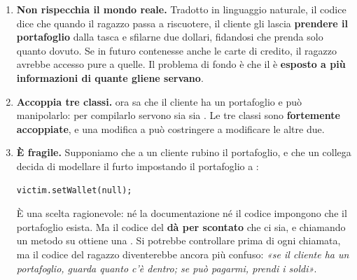 \begin{enumerate}
  \item \textbf{Non rispecchia il mondo reale.} Tradotto in linguaggio naturale, il codice dice che quando il ragazzo
        passa a riscuotere, il cliente gli lascia \textbf{prendere il portafoglio} dalla tasca e sfilarne due dollari,
        fidandosi che prenda solo quanto dovuto. Se in futuro  contenesse anche le carte di credito, il
        ragazzo avrebbe accesso pure a quelle. Il problema di fondo è che il  è \textbf{esposto a più
        informazioni di quante gliene servano}.
  \item \textbf{Accoppia tre classi.}  ora sa che il cliente ha un portafoglio e può manipolarlo: per
        compilarlo servono sia  sia . Le tre classi sono \textbf{fortemente accoppiate}, e una
        modifica a  può costringere a modificare le altre due.
  \item \textbf{È fragile.} Supponiamo che a un cliente rubino il portafoglio, e che un collega decida di modellare il
        furto impostando il portafoglio a :
\begin{lstlisting}[style=java]
victim.setWallet(null);
\end{lstlisting}
        È una scelta ragionevole: né la documentazione né il codice impongono che il
        portafoglio esista. Ma il codice del  \textbf{dà per scontato} che ci sia, e chiamando un metodo su
         ottiene una . Si potrebbe controllare  prima di ogni chiamata, ma il
        codice del ragazzo diventerebbe ancora più confuso: \textit{«se il cliente ha un portafoglio, guarda quanto c'è
        dentro; se può pagarmi, prendi i soldi»}.
\end{enumerate}

\begin{center}
\end{center}

